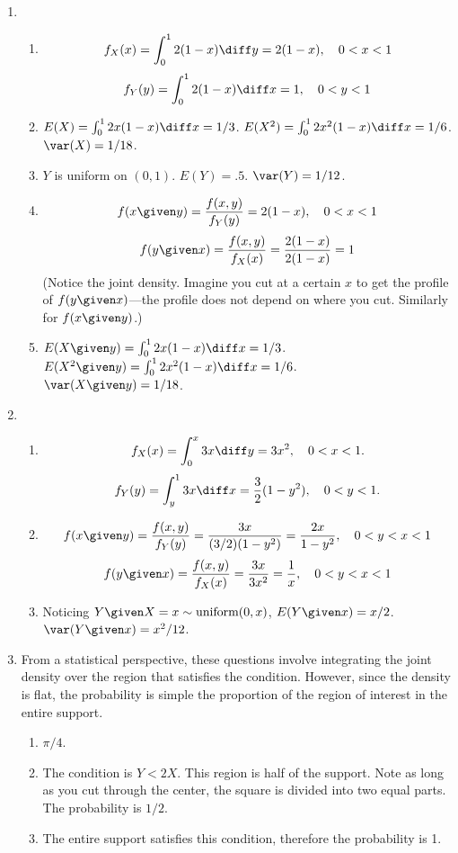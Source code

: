\documentclass[12pt]{article}
\begin{document}
\begin{enumerate}
\item
\begin{enumerate}
\item
\[
f_X(x) = \int_0^1 2(1-x) \diff y = 2(1-x),\quad 0<x<1
\]
\[
f_Y(y) = \int_0^1 2(1-x) \diff x = 1,\quad 0<y<1
\]
\item
$E(X) = \int_0^1 2x(1-x) \diff x = 1/3$.
$E(X^2) = \int_0^1 2x^2(1-x) \diff x = 1/6$.
$\var(X) = 1/18$.

\item
$Y$ is uniform on $(0,1)$.
$E(Y) = .5$. $\var(Y) = 1/12$.

\item
\[
f(x\given y)
= \frac{f(x,y)}{f_Y(y)}
= 2(1-x)
,\quad
0<x<1
\]
\[
f(y\given x)
= \frac{f(x,y)}{f_X(x)}
= \frac{2(1-x)}{2(1-x)}
= 1
\]
(Notice the joint density.
Imagine you cut at a certain $x$ to get the profile of
$f(y\given x)$---the profile does not depend on where you cut.
Similarly for $f(x\given y)$.)

\item
$E(X\given y) = \int_0^1 2x(1-x)\diff x = 1/3$.\\
$E(X^2\given y) = \int_0^1 2x^2(1-x) \diff x = 1/6$.\\
$\var(X\given y) = 1/18$.
\end{enumerate}

\item
\begin{enumerate}
\item
\[
f_X(x) = \int_0^x 3x\diff y = 3x^2,
\quad 0<x<1.
\]
\[
f_Y(y) = \int_y^1 3x \diff x = \frac{3}{2}(1 - y^2),
\quad 0<y<1.
\]

\item
\[
f(x\given y)
= \frac{f(x,y)}{f_Y(y)}
= \frac{3x}{(3/2)(1-y^2)} = \frac{2x}{1-y^2}
,\quad 0<y<x<1
\]
\[
f(y\given x)
= \frac{f(x,y)}{f_X(x)}
= \frac{3x}{3x^2}
= \frac{1}{x}
,\quad 0<y<x<1
\]

\item
Noticing $Y\given X=x \sim \text{uniform}(0,x)$,
$E(Y \given x) = x/2$.
$\var(Y\given x) = x^2/12$.

\end{enumerate}

\item
From a statistical perspective,
these questions involve integrating the joint density
over the region that satisfies the condition.
However, since the density is flat,
the probability is simple the proportion of the region of interest
in the entire support.
\begin{enumerate}
\item  $\pi/4$.
\item The condition is $Y < 2X$. This region is half of the support.
Note as long as you cut through the center,
the square is divided into two equal parts.
The probability is $1/2$.
\item The entire support satisfies this condition, therefore the
probability is 1.
\end{enumerate}


\end{enumerate}
\end{document}
